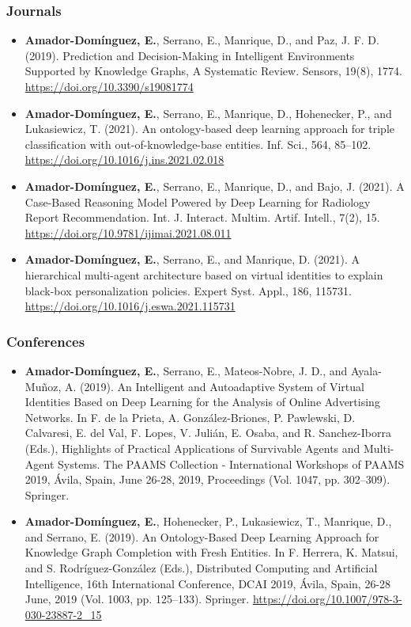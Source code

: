 \subsubsection*{Journals}
\begin{itemize}
    \item \textbf{Amador-Domínguez, E.}, Serrano, E., Manrique, D., and Paz, J. F. D. (2019). Prediction and Decision-Making in Intelligent Environments Supported by Knowledge Graphs, A Systematic Review. Sensors, 19(8), 1774. \url{https://doi.org/10.3390/s19081774} 
    \item \textbf{Amador-Domínguez, E.}, Serrano, E., Manrique, D., Hohenecker, P., and Lukasiewicz, T. (2021). An ontology-based deep learning approach for triple classification with out-of-knowledge-base entities. Inf. Sci., 564, 85–102. \url{https://doi.org/10.1016/j.ins.2021.02.018} 
    \item \textbf{Amador-Domínguez, E.}, Serrano, E., Manrique, D., and Bajo, J. (2021). A Case-Based Reasoning Model Powered by Deep Learning for Radiology Report Recommendation. Int. J. Interact. Multim. Artif. Intell., 7(2), 15. \url{https://doi.org/10.9781/ijimai.2021.08.011} 
    \item \textbf{Amador-Domínguez, E.}, Serrano, E., and Manrique, D. (2021). A hierarchical multi-agent architecture based on virtual identities to explain black-box personalization policies. Expert Syst. Appl., 186, 115731. \url{https://doi.org/10.1016/j.eswa.2021.115731} 
\end{itemize}
\subsubsection*{Conferences}
\begin{itemize}
    \item \textbf{Amador-Domínguez, E.}, Serrano, E., Mateos-Nobre, J. D., and Ayala-Muñoz, A. (2019). An Intelligent and Autoadaptive System of Virtual Identities Based on Deep Learning for the Analysis of Online Advertising Networks. In F. de la Prieta, A. González-Briones, P. Pawlewski, D. Calvaresi, E. del Val, F. Lopes, V. Julián, E. Osaba, and R. Sanchez-Iborra (Eds.), Highlights of Practical Applications of Survivable Agents and Multi-Agent Systems. The PAAMS Collection - International Workshops of PAAMS 2019, Ávila, Spain, June 26-28, 2019, Proceedings (Vol. 1047, pp. 302–309). Springer. 
    
    \item \textbf{Amador-Domínguez, E.}, Hohenecker, P., Lukasiewicz, T., Manrique, D., and Serrano, E. (2019). An Ontology-Based Deep Learning Approach for Knowledge Graph Completion with Fresh Entities. In F. Herrera, K. Matsui, and S. Rodríguez-González (Eds.), Distributed Computing and Artificial Intelligence, 16th International Conference, DCAI 2019, Ávila, Spain, 26-28 June, 2019 (Vol. 1003, pp. 125–133). Springer. 
    \url{https://doi.org/10.1007/978-3-030-23887-2\_15} 
\end{itemize}
